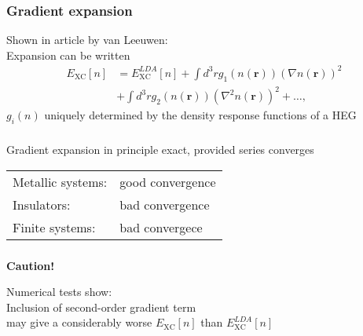 \documentclass[compress]{beamer}
\begin{document}
\frame
{ 
  \frametitle{Gradient expansion}
  \begin{small}
    {\scriptsize
      Shown in article by van Leeuwen: \\
      \vspace{2mm}
      Expansion can be written
      \begin{align}
        E_{\mathrm{XC}}[n]&=E_{\mathrm{XC}}^{LDA}[n]+\int d^{3}r g_{1}(n(\mathbf{r}))(\nabla n(\mathbf{r}))^{2} \nonumber \\
        &+\int d^{3}r g_{2}(n(\mathbf{r}))(\nabla^{2}n(\mathbf{r}))^{2}+\dots , \nonumber
      \end{align}
      $g_{i}(n)$ uniquely determined by the density response functions of a HEG
    }
  \end{small}
}

\frame
{ 
  \frametitle{}
  \begin{small}
    {\scriptsize
      \begin{center}
        Gradient expansion in principle exact, \alert{provided series converges}
        
        \vspace{10mm}
        \begin{tabular}{l l}
          \hline
          Metallic systems: & good convergence \\
          Insulators: & bad convergence \\
          Finite systems: & bad convergece \\
          \hline
        \end{tabular}
      \end{center}
    }
  \end{small}
}

\frame
{ 
  \frametitle{}
  \begin{small}
    {\scriptsize
      \alert{\textbf{Caution!}}
      
      \vspace{5mm}
      \begin{center}
        Numerical tests show: \\
        Inclusion of second-order gradient term \\
        may give a considerably worse $E_{\mathrm{XC}}[n]$ than $E_{\mathrm{XC}}^{LDA}[n]$
      \end{center}

      \vspace{5mm}
      $\qquad \qquad \qquad \qquad \qquad \qquad \qquad \qquad \qquad \qquad \qquad \qquad \qquad \qquad \quad $ 
    }
  \end{small}
}
\end{document}
